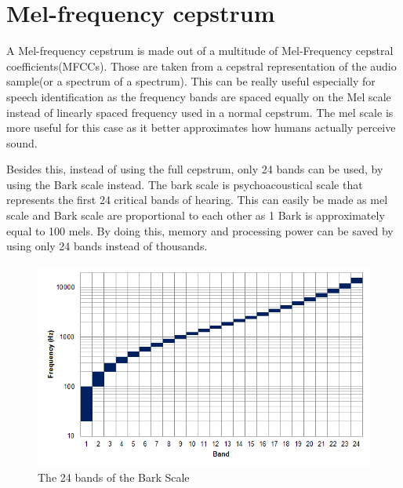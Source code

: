 
\section{Mel-frequency cepstrum}
A Mel-frequency cepstrum is made out of a multitude of Mel-Frequency cepstral coefficients(MFCCs). 
Those are taken from a cepstral representation of the audio sample(or a spectrum of a spectrum).
This can be really useful especially for speech identification as the frequency bands are spaced 
equally on the Mel scale instead of linearly spaced frequency used in a normal cepstrum. 
The mel scale is more useful for this case as it better approximates how humans actually perceive sound.


Besides this, instead of using the full cepstrum, only 24 bands can be used, 
by using the Bark scale instead.
The bark scale is psychoacoustical scale that represents the first 24 critical bands of hearing.
This can easily be made as mel scale and Bark scale are proportional to each other as 1 Bark 
is approximately equal to 100 mels.
By doing this, memory and processing power can be saved by using only 24 bands instead of thousands.
\begin{figure}[htp]
	\centering
	\includegraphics[width=1\textwidth]{Illustrations/Bark_scale.png}
	\caption{The 24 bands of the Bark Scale}
	\label{fig:BarkScale}
\end{figure}
\newpage